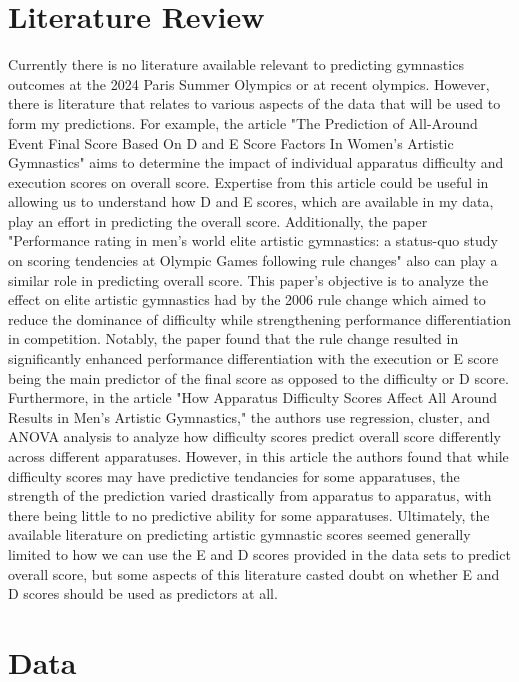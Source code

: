 \documentclass[12pt]{article}
\begin{document}
\section{Literature Review}
\label{sec:lit}

Currently there is no literature available relevant to predicting gymnastics outcomes at the 2024 
Paris Summer Olympics or at recent olympics. However, there is literature that relates to various aspects of 
the data that will be used to form my predictions. For example, the article "The Prediction of All-Around 
Event Final Score Based On D and E Score Factors In Women's Artistic Gymnastics" aims to determine the 
impact of individual apparatus difficulty and execution scores on overall score. 
Expertise from this article could be useful in allowing us to understand how D and E scores, 
which are available in my data, play an effort in predicting the overall score. Additionally, the paper 
"Performance rating in men’s world elite artistic gymnastics: a status-quo study on scoring 
tendencies at Olympic Games following rule changes" also can play a similar role in predicting overall 
score. This paper's objective is to analyze the effect on elite artistic gymnastics had by the 2006 rule change 
which aimed to reduce the dominance of difficulty while strengthening performance differentiation in 
competition. Notably, the paper found that the rule change resulted in significantly enhanced performance 
differentiation with the execution or E score being the main predictor of the final score as opposed to 
the difficulty or D score. Furthermore, in the article "How Apparatus Difficulty Scores Affect All 
Around Results in Men's Artistic Gymnastics," the authors use regression, cluster, and ANOVA analysis to 
analyze how difficulty scores predict overall score differently across different apparatuses. However, in this 
article the authors found that while difficulty scores may have predictive tendancies for some apparatuses, 
the strength of the prediction varied drastically from apparatus to apparatus, with there being little to no 
predictive ability for some apparatuses. Ultimately, the available literature on predicting artistic 
gymnastic scores seemed generally limited to how we can use the E and D scores provided in the data sets 
to predict overall score, but some aspects of this literature casted doubt on whether E and D scores should be 
used as predictors at all.

\section{Data}
\label{sec:data}
\end{document}
